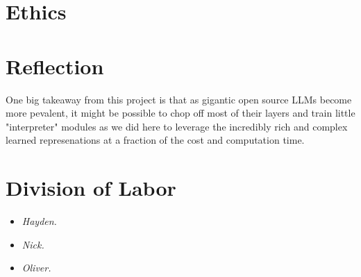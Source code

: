 \documentclass[14pt]{article}
\begin{document}
\section{Ethics}

\section{Reflection}

One big takeaway from this project is that as gigantic open source LLMs become more pevalent, it might be possible to chop off most of their layers and train little "interpreter" modules as we did here to leverage the incredibly rich and complex learned represenations at a fraction of the cost and computation time.

\section{Division of Labor}
\begin{itemize}
    \item \textit{Hayden.}
    \item \textit{Nick.} 
    \item \textit{Oliver.} 
\end{itemize}
\end{document}
